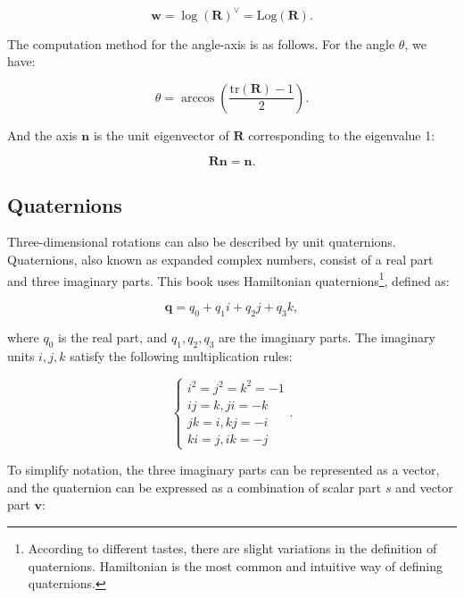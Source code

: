 \begin{equation}
	\mathbf{w} = \log (\mathbf{R}) ^ \vee = \mathrm{Log}(\mathbf{R}).
\end{equation}

The computation method for the angle-axis is as follows. For the angle $\theta$, we have:

\begin{equation}
	\label{eq:R2theta}
	\theta = \arccos \left( \frac{\mathrm{tr}(\mathbf{R}) - 1}{2} \right).
\end{equation}

And the axis $\mathbf{n}$ is the unit eigenvector of $\mathbf{R}$ corresponding to the eigenvalue 1:

\begin{equation}
	\label{eq:R2n}
	\mathbf{R} \mathbf{n} = \mathbf{n}.	
\end{equation}

\subsection{Quaternions}
Three-dimensional rotations can also be described by unit quaternions. Quaternions, also known as expanded complex numbers, consist of a real part and three imaginary parts. This book uses Hamiltonian quaternions\footnote{According to different tastes, there are slight variations in the definition of quaternions. Hamiltonian is the most common and intuitive way of defining quaternions.}, defined as:

\begin{equation}
	\mathbf{q} = q_0 + q_1 i + q_2 j + q_3 k,
\end{equation}

where $q_0$ is the real part, and $q_1, q_2, q_3$ are the imaginary parts. The imaginary units $i, j, k$ satisfy the following multiplication rules:

\begin{equation}
	\label{eq:quaternionVirtual}
	\left\{ \begin{array}{l}
		{i^2} = {j^2} = {k^2} =  - 1\\
		ij = k,ji =  - k\\
		jk = i,kj =  - i\\
		ki = j,ik =  - j
	\end{array} \right. .
\end{equation}

To simplify notation, the three imaginary parts can be represented as a vector, and the quaternion can be expressed as a combination of scalar part $s$ and vector part $\mathbf{v}$:

